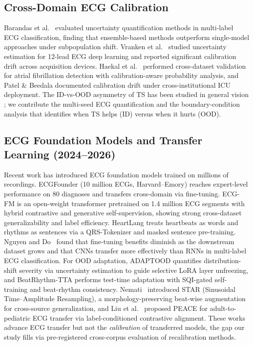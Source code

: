\documentclass[final,5p,times,nonatbib]{elsarticle}
\begin{document}
\subsection{Cross-Domain ECG Calibration}
Barandas et al.\ \cite{barandas2023} evaluated uncertainty
quantification methods in multi-label ECG classification, finding that
ensemble-based methods outperform single-model approaches under
subpopulation shift. Vranken et al.\ \cite{zhang2022} studied
uncertainty estimation for 12-lead ECG deep learning and reported
significant calibration drift across acquisition devices. Haekal et
al.\ \cite{physiolmeas2026} performed cross-dataset validation for
atrial fibrillation detection with calibration-aware probability
analysis, and Patel \& Beedala \cite{medrxiv2026} documented
calibration drift under cross-institutional ICU deployment. The
ID-vs-OOD asymmetry of TS has been studied in general vision
\cite{ovadia2019calibration}; we contribute the multi-seed ECG
quantification and the boundary-condition analysis that identifies
when TS helps (ID) versus when it hurts (OOD).

\subsection{ECG Foundation Models and Transfer Learning (2024--2026)}
Recent work has introduced ECG foundation models trained on millions
of recordings. ECGFounder \cite{ecgfounder2024,song2024ecgfm}
(10 million ECGs, Harvard--Emory) reaches expert-level performance on
80 diagnoses and transfers cross-domain via fine-tuning. ECG-FM
\cite{ecgfm2024} is an open-weight transformer pretrained on 1.4
million ECG segments with hybrid contrastive and generative
self-supervision, showing strong cross-dataset generalizability and
label efficiency. HeartLang \cite{heartlang2025} treats heartbeats as
words and rhythms as sentences via a QRS-Tokenizer and masked
sentence pre-training. Nguyen and Do\ \cite{transferecg2025} found that
fine-tuning benefits diminish as the downstream dataset grows and
that CNNs transfer more effectively than RNNs in multi-label ECG
classification. For OOD adaptation, ADAPTOOD \cite{adaptood2026}
quantifies distribution-shift severity via uncertainty estimation to
guide selective LoRA layer unfreezing, and BeatRhythm-TTA
\cite{beatrhythm2026} performs test-time adaptation with SQI-gated
self-training and beat-rhythm consistency. Nemati\
\cite{star2025} introduced STAR (Sinusoidal Time--Amplitude
Resampling), a morphology-preserving beat-wise augmentation for
cross-source generalization, and Liu et al.\ \cite{peace2026}
proposed PEACE for adult-to-pediatric ECG transfer via
label-conditioned contrastive alignment. These works advance ECG
transfer but not the \emph{calibration} of transferred models, the
gap our study fills via pre-registered cross-corpus evaluation of
recalibration methods.
\end{document}
